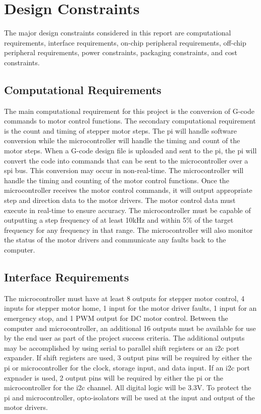 \section{Design Constraints}
The major design constraints considered in this report are computational requirements, interface requirements, on-chip peripheral requirements, off-chip peripheral requirements, power constraints, packaging constraints, and cost constraints.

\subsection{Computational Requirements}
The main computational requirement for this project is the conversion of G-code commands to motor control functions.
The secondary computational requirement is the count and timing of stepper motor steps.
The \gls{pi} will handle software conversion while the microcontroller will handle the timing and count of the motor steps.
When a G-code design file is uploaded and sent to the \gls{pi}, the \gls{pi} will convert the code into commands that can be sent to the microcontroller over a \gls{spi} bus.
This conversion may occur in non-real-time.
The microcontroller will handle the timing and counting of the motor control functions.
Once the microcontroller receives the motor control commands, it will output appropriate step and direction data to the motor drivers.
The motor control data must execute in real-time to ensure accuracy.
The microcontroller must be capable of outputting a step frequency of at least 10kHz and within 5\% of the target frequency for any frequency in that range.
The microcontroller will also monitor the status of the motor drivers and communicate any faults back to the computer.

\subsection{Interface Requirements}
The microcontroller must have at least 8 outputs for stepper motor control, 4 inputs for stepper motor home, 1 input for the motor driver faults, 1 input for an emergency stop, and 1 PWM output for DC motor control.
Between the computer and microcontroller, an additional 16 outputs must be available for use by the end user as part of the project success criteria.
The additional outputs may be accomplished by using serial to parallel shift registers or an \gls{i2c} port expander.
If shift registers are used, 3 output pins will be required by either the pi or microcontroller for the clock, storage input, and data input.
If an \gls{i2c} port expnader is used, 2 output pins will be required by either the \gls{pi} or the microcontroller for the \gls{i2c} channel.
All digital logic will be 3.3V.
To protect the \gls{pi} and microcontroller, opto-isolators will be used at the input and output of the motor drivers.

